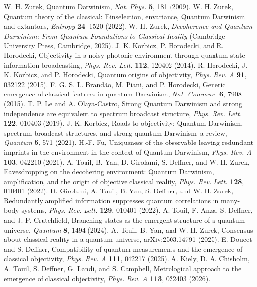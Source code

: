 W. H. Zurek, Quantum Darwinism, \emph{Nat. Phys.} \textbf{5}, 181 (2009).
 W. H. Zurek, Quantum theory of the classical: Einselection, envariance, Quantum Darwinism and extantons, \emph{Entropy} \textbf{24}, 1520 (2022).
 W. H. Zurek, \emph{Decoherence and Quantum Darwinism: From Quantum Foundations to Classical Reality} (Cambridge University Press, Cambridge, 2025).
 J. K. Korbicz, P. Horodecki, and R. Horodecki, Objectivity in a noisy photonic environment through quantum state information broadcasting, \emph{Phys. Rev. Lett.} \textbf{112}, 120402 (2014).
 R. Horodecki, J. K. Korbicz, and P. Horodecki, Quantum origins of objectivity, \emph{Phys. Rev. A} \textbf{91}, 032122 (2015).
 F. G. S. L. Brand\~ao, M. Piani, and P. Horodecki, Generic emergence of classical features in quantum Darwinism, \emph{Nat. Commun.} \textbf{6}, 7908 (2015).
 T. P. Le and A. Olaya-Castro, Strong Quantum Darwinism and strong independence are equivalent to spectrum broadcast structure, \emph{Phys. Rev. Lett.} \textbf{122}, 010403 (2019).
 J. K. Korbicz, Roads to objectivity: Quantum Darwinism, spectrum broadcast structures, and strong quantum Darwinism--a review, \emph{Quantum} \textbf{5}, 571 (2021).
 H.-F. Fu, Uniqueness of the observable leaving redundant imprints in the environment in the context of Quantum Darwinism, \emph{Phys. Rev. A} \textbf{103}, 042210 (2021).
 A. Touil, B. Yan, D. Girolami, S. Deffner, and W. H. Zurek, Eavesdropping on the decohering environment: Quantum Darwinism, amplification, and the origin of objective classical reality, \emph{Phys. Rev. Lett.} \textbf{128}, 010401 (2022).
 D. Girolami, A. Touil, B. Yan, S. Deffner, and W. H. Zurek, Redundantly amplified information suppresses quantum correlations in many-body systems, \emph{Phys. Rev. Lett.} \textbf{129}, 010401 (2022).
 A. Touil, F. Anza, S. Deffner, and J. P. Crutchfield, Branching states as the emergent structure of a quantum universe, \emph{Quantum} \textbf{8}, 1494 (2024).
 A. Touil, B. Yan, and W. H. Zurek, Consensus about classical reality in a quantum universe, arXiv:2503.14791 (2025).
 E. Doucet and S. Deffner, Compatibility of quantum measurements and the emergence of classical objectivity, \emph{Phys. Rev. A} \textbf{111}, 042217 (2025).
 A. Kiely, D. A. Chisholm, A. Touil, S. Deffner, G. Landi, and S. Campbell, Metrological approach to the emergence of classical objectivity, \emph{Phys. Rev. A} \textbf{113}, 022403 (2026).
